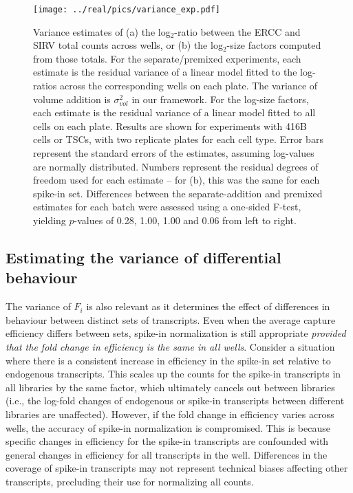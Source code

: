 \documentclass{article}
\begin{document}
\begin{figure}[btp]
    \begin{center}
        \texttt{[image: ../real/pics/variance\_exp.pdf]}
    \end{center}
    \caption{Variance estimates of (a) the log$_2$-ratio between the ERCC and SIRV total counts across wells, or (b) the log$_2$-size factors computed from those totals.
        For the separate/premixed experiments, each estimate is the residual variance of a linear model fitted to the log-ratios across the corresponding wells on each plate.
        The variance of volume addition is $\sigma^2_{vol}$ in our framework.
        For the log-size factors, each estimate is the residual variance of a linear model fitted to all cells on each plate.
        Results are shown for experiments with 416B cells or TSCs, with two replicate plates for each cell type.
        Error bars represent the standard errors of the estimates, assuming log-values are normally distributed.
        Numbers represent the residual degrees of freedom used for each estimate -- for (b), this was the same for each spike-in set.
        Differences between the separate-addition and premixed estimates for each batch were assessed using a one-sided F-test, yielding $p$-values of 0.28, 1.00, 1.00 and 0.06 from left to right.
    }
    \label{fig:varestimates}
\end{figure}

\subsection*{Estimating the variance of differential behaviour}
The variance of $F_i$ is also relevant as it determines the effect of differences in behaviour between distinct sets of transcripts.
Even when the average capture efficiency differs between sets, spike-in normalization is still appropriate \textit{provided that the fold change in efficiency is the same in all wells}.
Consider a situation where there is a consistent increase in efficiency in the spike-in set relative to endogenous transcripts.
This scales up the counts for the spike-in transcripts in all libraries by the same factor, which ultimately cancels out between libraries (i.e., the log-fold changes of endogenous or spike-in transcripts between different libraries are unaffected).
However, if the fold change in efficiency varies across wells, the accuracy of spike-in normalization is compromised.
This is because specific changes in efficiency for the spike-in transcripts are confounded with general changes in efficiency for all transcripts in the well.
Differences in the coverage of spike-in transcripts may not represent technical biases affecting other transcripts, precluding their use for normalizing all counts.
\end{document}

